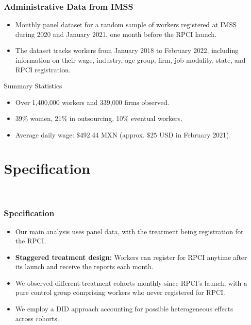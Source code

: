 \documentclass[notes,11pt, aspectratio=169]{beamer}
\newenvironment{transitionframe}{
  \setbeamercolor{background canvas}{bg=blue}
  \begin{frame}}{
    \end{frame}
}
\begin{document}
\begin{frame}
\frametitle{Administrative Data from IMSS}
\begin{itemize}
    \vfill\item Monthly panel dataset for a random sample of workers registered at IMSS during 2020 and January 2021, one month before the RPCI launch.
    \vfill\item The dataset tracks workers from January 2018 to February 2022, including information on their wage, industry, age group, firm, job modality, state, and RPCI registration.
\end{itemize}

\vfill
\begin{block}{Summary Statistics}
    \begin{itemize}
        \item Over 1,400,000 workers and 339,000 firms observed.
        \item 39\% women, 21\% in outsourcing, 10\% eventual workers.
        \item Average daily wage: $\$492.44$ MXN (approx. $\$25$ USD in February 2021).
    \end{itemize}
\end{block}
\end{frame}

\section{Specification}
\begin{transitionframe}
  \begin{center}
    \Huge \textcolor{white}{Specification}
  \end{center}
\end{transitionframe}

\begin{frame}
\frametitle{Specification}
\begin{itemize}
    \vfill\item Our main analysis uses panel data, with the treatment being registration for the RPCI.
    \vfill\item \textbf{Staggered treatment design:} Workers can register for RPCI anytime after its launch and receive the reports each month.
    \vfill\item We observed different treatment cohorts monthly since RPCI's launch, with a pure control group comprising workers who never registered for RPCI.
    \vfill\item We employ a DID approach accounting for possible heterogeneous effects across cohorts.
\end{itemize}
\end{frame}
\end{document}
